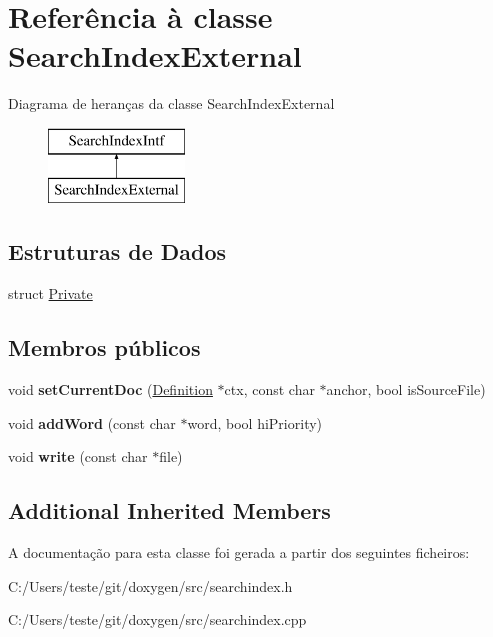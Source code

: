\hypertarget{class_search_index_external}{\section{Referência à classe Search\-Index\-External}
\label{class_search_index_external}
}
Diagrama de heranças da classe Search\-Index\-External\begin{figure}[H]
\begin{center}
\leavevmode
\includegraphics[height=2.000000cm]{class_search_index_external}
\end{center}
\end{figure}
\subsection*{Estruturas de Dados}
\begin{DoxyCompactItemize}
\item 
struct \hyperlink{struct_search_index_external_1_1_private}{Private}
\end{DoxyCompactItemize}
\subsection*{Membros públicos}
\begin{DoxyCompactItemize}
\item 
\hypertarget{class_search_index_external_acc249d4a52270a8445bfc2204a399b4a}{void {\bfseries set\-Current\-Doc} (\hyperlink{class_definition}{Definition} $\ast$ctx, const char $\ast$anchor, bool is\-Source\-File)}\label{class_search_index_external_acc249d4a52270a8445bfc2204a399b4a}

\item 
\hypertarget{class_search_index_external_aef206d2620c6a5bc4afcb9a3874dc6b2}{void {\bfseries add\-Word} (const char $\ast$word, bool hi\-Priority)}\label{class_search_index_external_aef206d2620c6a5bc4afcb9a3874dc6b2}

\item 
\hypertarget{class_search_index_external_afa926fcfb9459ef9d88b8fcafb5552b7}{void {\bfseries write} (const char $\ast$file)}\label{class_search_index_external_afa926fcfb9459ef9d88b8fcafb5552b7}

\end{DoxyCompactItemize}
\subsection*{Additional Inherited Members}


A documentação para esta classe foi gerada a partir dos seguintes ficheiros\-:\begin{DoxyCompactItemize}
\item 
C\-:/\-Users/teste/git/doxygen/src/searchindex.\-h\item 
C\-:/\-Users/teste/git/doxygen/src/searchindex.\-cpp\end{DoxyCompactItemize}
